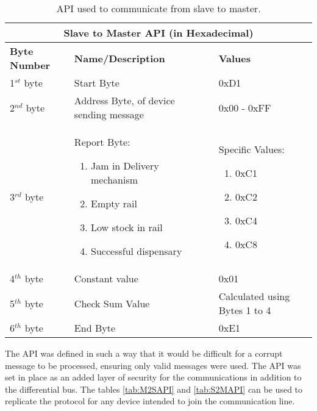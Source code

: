 \documentclass[a4paper,11pt]{article}
\numberwithin{figure}{section}
\numberwithin{table}{section}
\begin{document}
	\begin{center}
		\begin{table}[ht]
			\centering
			\begin{tabular}{| m{3cm} | m{5cm}| m{5cm} |}
			\hline
			\multicolumn{3}{|c|}{\bfseries Slave to Master API (in Hexadecimal)}\\
			\hline
			\bfseries{Byte Number}  & \bfseries{Name/Description} & \bfseries{Values} \\
			\hline
			1$^{st}$ byte & Start Byte & 0xD1\\
			\hline
			2$^{nd}$ byte & Address Byte, of device sending message & 0x00 - 0xFF\\
			\hline
			3$^{rd}$ byte & Report Byte:\begin{enumerate}
											\setlength{\itemsep}{0pt}
   											\setlength{\parskip}{0pt}
    										\setlength{\parsep}{0pt} 
											\item Jam in Delivery mechanism
											\item Empty rail
											\item Low stock in rail
											\item Successful dispensary
										\end{enumerate} & Specific Values: \begin{enumerate}
																				\setlength{\itemsep}{0pt}
   																				\setlength{\parskip}{0pt}
    																			\setlength{\parsep}{0pt} 
																				\item 0xC1
																				\item 0xC2
																				\item 0xC4
																				\item 0xC8
																			\end{enumerate}\\
			\hline
			4$^{th}$ byte & Constant value & 0x01 \\
			\hline
			5$^{th}$ byte & Check Sum Value & Calculated using Bytes 1 to 4\\
			\hline
			6$^{th}$ byte & End Byte & 0xE1 \\
			\hline
			\end{tabular}
		\caption{API used to communicate from slave to master. \label{tab:S2MAPI}}
		\end{table}
	\end{center}

The API was defined in such a way that it would be difficult for a corrupt message to be processed, ensuring only valid messages were used. The API was set in place as an added layer of security for the communications in addition to the differential bus. The tables \autoref{tab:M2SAPI} and \autoref{tab:S2MAPI} can be used to replicate the protocol for any device intended to join the communication line.
\end{document}
